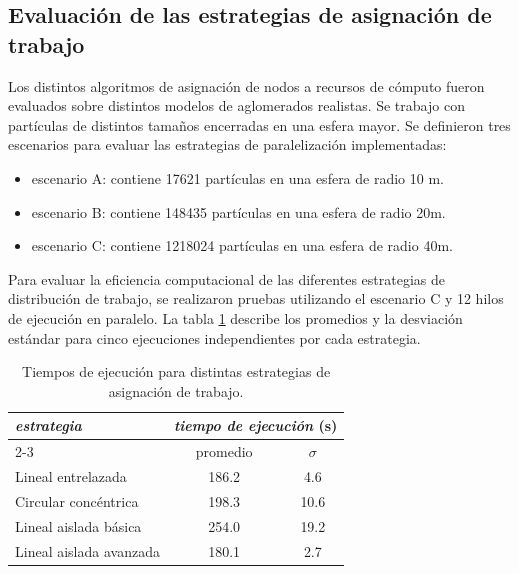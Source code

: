 \documentclass[a4paper,11pt]{book}
\begin{document}
\subsection{Evaluación de las estrategias de asignación de trabajo}
Los distintos algoritmos de asignación de nodos a recursos de cómputo fueron evaluados sobre distintos modelos de aglomerados realistas. Se trabajo con partículas de distintos tamaños encerradas en una esfera mayor.\newline
Se definieron tres escenarios para evaluar las estrategias de paralelización implementadas:

\begin{itemize}
	\item escenario A: contiene 17621 partículas en una esfera de radio 10 m.
	\item escenario B: contiene 148435 partículas en una esfera de radio 20m.
	\item escenario C: contiene 1218024 partículas en una esfera de radio 40m.
\end{itemize}

Para evaluar la eficiencia computacional de las diferentes estrategias de distribución de trabajo, se realizaron pruebas utilizando el escenario C y 12 hilos de ejecución en paralelo.
La tabla \ref {table:estrategias_asignacion_trabajo} describe los promedios y la desviación estándar para cinco ejecuciones independientes por cada estrategia.

\begin{table}[ht]
    \centering
    \begin{tabular}{lcc}
        \toprule
        \multirow{2}{*}{\textit{estrategia}} 
        & \multicolumn{2}{c}{\textit{tiempo de ejecución} (s)} \\
        \cmidrule(lr){2-3}
        & promedio & $\sigma$ \\
        \midrule
        Lineal entrelazada          & 186.2 & 4.6  \\
        Circular concéntrica        & 198.3 & 10.6 \\
        Lineal aislada básica       & 254.0 & 19.2 \\
        Lineal aislada avanzada     & 180.1 & 2.7  \\
        \bottomrule
    \end{tabular}    
    \caption{Tiempos de ejecución para distintas estrategias de asignación de trabajo.}
    \label{table:estrategias_asignacion_trabajo}
\end{table}
\end{document}
